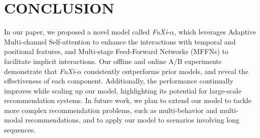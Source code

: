 
\section{CONCLUSION}

In our paper, we proposed a novel model called \textit{FuXi}-$\alpha$, which leverages Adaptive Multi-channel Self-attention to enhance the interactions with temporal and positional features, and Multi-stage Feed-Forward Networks (MFFNs) to facilitate implicit interactions. Our offline and online A/B experiments demonstrate that \textit{FuXi}-$\alpha$ consistently outperforms prior models, and reveal the effectiveness of each component. Additionally, the performance continually improves while scaling up our model, highlighting its potential for large-scale recommendation systems. In future work, we plan to extend our model to tackle more complex recommendation problems, such as multi-behavior and multi-modal recommendations, and to apply our model to scenarios involving long sequences.
